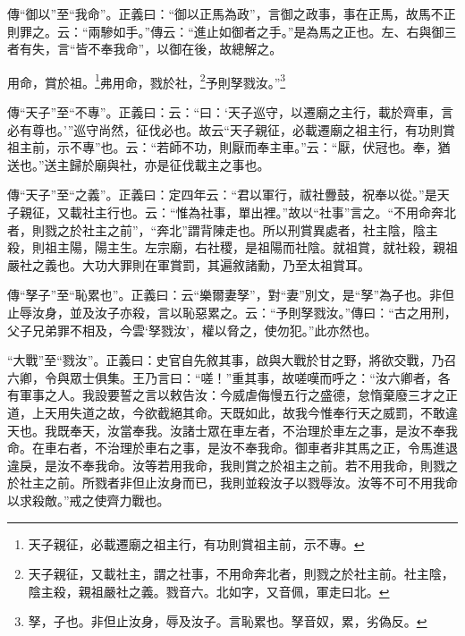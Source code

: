 {\noindent\zhuan{}\fzbyks 傳“御以”至“我命”。正義曰：“御以正馬為政”，言御之政事，事在正馬，故馬不正則罪之。云：“兩驂如手。”傳云：“進止如御者之手。”是為馬之正也。左、右與御三者有失，言“皆不奉我命”，以御在後，故總解之。 \par}

用命，賞於祖。\footnote{天子親征，必載遷廟之祖主行，有功則賞祖主前，示不專。}弗用命，戮於社，\footnote{天子親征，又載社主，謂之社事，不用命奔北者，則戮之於社主前。社主陰，陰主殺，親祖嚴社之義。戮音六。北如字，又音佩，軍走曰北。}予則孥戮汝。”\footnote{孥，子也。非但止汝身，辱及汝子。言恥累也。孥音奴，累，劣偽反。}

{\noindent\zhuan{}\fzbyks 傳“天子”至“不專”。正義曰：云：“曰：‘天子巡守，以遷廟之主行，載於齊車，言必有尊也。’”巡守尚然，征伐必也。故云“天子親征，必載遷廟之祖主行，有功則賞祖主前，示不專”也。云：“若師不功，則厭而奉主車。”云：“厭，伏冠也。奉，猶送也。”送主歸於廟與社，亦是征伐載主之事也。 \par}

{\noindent\zhuan{}\fzbyks 傳“天子”至“之義”。正義曰：定四年云：“君以軍行，祓社釁鼓，祝奉以從。”是天子親征，又載社主行也。云：“惟為社事，單出裡。”故以“社事”言之。“不用命奔北者，則戮之於社主之前”，“奔北”謂背陳走也。所以刑賞異處者，社主陰，陰主殺，則祖主陽，陽主生。左宗廟，右社稷，是祖陽而社陰。就祖賞，就社殺，親祖嚴社之義也。大功大罪則在軍賞罰，其遍敘諸勳，乃至太祖賞耳。 \par}

{\noindent\zhuan{}\fzbyks 傳“孥子”至“恥累也”。正義曰：云“樂爾妻孥”，對“妻”別文，是“孥”為子也。非但止辱汝身，並及汝子亦殺，言以恥惡累之。云：“予則孥戮汝。”傳曰：“古之用刑，父子兄弟罪不相及，今雲‘孥戮汝’，權以脅之，使勿犯。”此亦然也。 \par}

{\noindent\shu{}\fzkt “大戰”至“戮汝”。正義曰：史官自先敘其事，啟與大戰於甘之野，將欲交戰，乃召六卿，令與眾士俱集。王乃言曰：“嗟！”重其事，故嗟嘆而呼之：“汝六卿者，各有軍事之人。我設要誓之言以敕告汝：今威虐侮慢五行之盛德，怠惰棄廢三才之正道，上天用失道之故，今欲截絕其命。天既如此，故我今惟奉行天之威罰，不敢違天也。我既奉天，汝當奉我。汝諸士眾在車左者，不治理於車左之事，是汝不奉我命。在車右者，不治理於車右之事，是汝不奉我命。御車者非其馬之正，令馬進退違戾，是汝不奉我命。汝等若用我命，我則賞之於祖主之前。若不用我命，則戮之於社主之前。所戮者非但止汝身而已，我則並殺汝子以戮辱汝。汝等不可不用我命以求殺敵。”戒之使齊力戰也。 \par}

